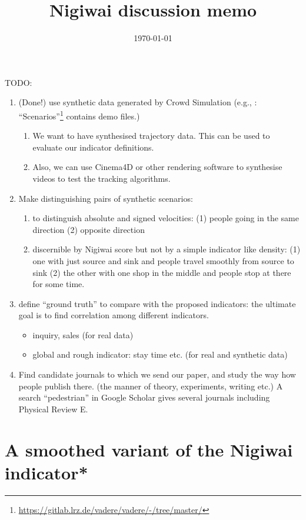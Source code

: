 \documentclass[a4paper,12pt]{amsart}
\title{Nigiwai discussion memo}
\date{\today}
\theoremstyle{definition}
\numberwithin{equation}{section}
\begin{document}
\maketitle

TODO:
\begin{enumerate}
\item (Done!) use synthetic data generated by Crowd Simulation (e.g., \cite{vedere}:
``Scenarios''\footnote{\url{https://gitlab.lrz.de/vadere/vadere/-/tree/master/}} contains demo files.)
\begin{enumerate}
\item We want to have synthesised trajectory data. This can be used to evaluate our indicator definitions.
\item Also, we can use Cinema4D or other rendering software to synthesise videos to test the tracking algorithms.
\end{enumerate}
\item Make distinguishing pairs of synthetic scenarios:
\begin{enumerate}
\item to distinguish absolute and signed velocities:
(1) people going in the same direction (2) opposite direction
\item 
discernible by Nigiwai score but not by a simple indicator like density:
(1) one with just source and sink and people travel smoothly from source to sink
(2) the other with one shop in the middle and people stop at there for some time.
\end{enumerate}
\item define ``ground truth'' to compare with the proposed indicators:
the ultimate goal is to find correlation among different indicators.
\begin{itemize}
\item inquiry, sales (for real data)
\item global and rough indicator: stay time etc. (for real and synthetic data)
\end{itemize}
\item Find candidate journals to which we send our paper, and study the way how people publish there.
(the manner of theory, experiments, writing etc.)
A search ``pedestrian'' in Google Scholar gives several journals including Physical Review E.
\end{enumerate}


\section{A smoothed variant of the Nigiwai indicator*}
\end{document}
